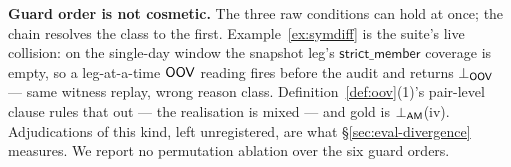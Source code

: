 \smallskip\noindent{}\textbf{Guard order is not cosmetic.}%
\label{sec:bind:guardorder}
The three raw conditions can hold at once; the chain resolves the class to the
first. Example~\ref{ex:symdiff} is the suite's live
collision: on the single-day window the snapshot leg's
$\mathsf{strict\_member}$ coverage is empty, so a leg-at-a-time $\mathsf{OOV}$
reading fires before the audit and returns $\bot_{\mathsf{OOV}}$ --- same
witness replay, wrong reason class.
Definition~\ref{def:oov}(1)'s pair-level clause rules that out --- the
realisation is mixed --- and gold is
$\bot_{\mathsf{AM}}$(iv). Adjudications of this kind, left unregistered, are what
\S\ref{sec:eval-divergence} measures. We report no permutation ablation over
the six guard orders.
